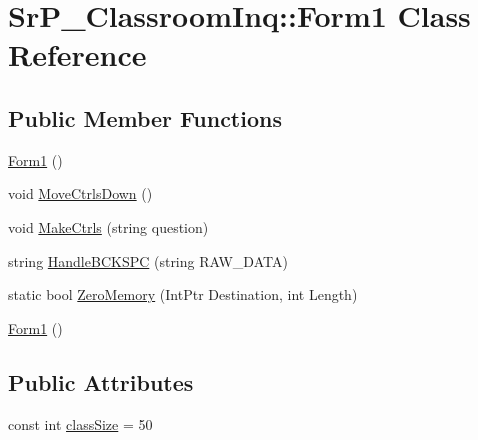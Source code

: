 \hypertarget{class_sr_p___classroom_inq_1_1_form1}{
\section{\-Sr\-P\-\_\-\-Classroom\-Inq\-:\-:\-Form1 \-Class \-Reference}
\label{class_sr_p___classroom_inq_1_1_form1}
}
\subsection*{\-Public \-Member \-Functions}
\begin{DoxyCompactItemize}
\item 
\hyperlink{class_sr_p___classroom_inq_1_1_form1_af6bb96bce0d0e2ee4ecf22e9646d625c}{\-Form1} ()
\item 
void \hyperlink{class_sr_p___classroom_inq_1_1_form1_a82b651a7439c7b24152a333d2d82ece8}{\-Move\-Ctrls\-Down} ()
\item 
void \hyperlink{class_sr_p___classroom_inq_1_1_form1_a7d34aa86d3e3e12e09e8147a0b6ee072}{\-Make\-Ctrls} (string question)
\item 
string \hyperlink{class_sr_p___classroom_inq_1_1_form1_a154ef9a50a7c641c415104da986d3c44}{\-Handle\-B\-C\-K\-S\-P\-C} (string \-R\-A\-W\-\_\-\-D\-A\-T\-A)
\item 
static bool \hyperlink{class_sr_p___classroom_inq_1_1_form1_a918fe0d5c50aa82435083ba2b386d840}{\-Zero\-Memory} (\-Int\-Ptr \-Destination, int \-Length)
\item 
\hyperlink{class_sr_p___classroom_inq_1_1_form1_af6bb96bce0d0e2ee4ecf22e9646d625c}{\-Form1} ()
\end{DoxyCompactItemize}
\subsection*{\-Public \-Attributes}
\begin{DoxyCompactItemize}
\item 
const int \hyperlink{class_sr_p___classroom_inq_1_1_form1_aa72fbad603134163dc413daf9feea87e}{class\-Size} = 50
\end{DoxyCompactItemize}
